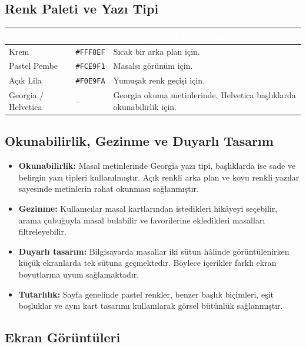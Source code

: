 \documentclass[12pt,a4paper]{article}
\begin{document}
\subsection{Renk Paleti ve Yazı Tipi}
\begin{center}
\begin{tabular}{@{}llp{6.4cm}@{}}
\toprule
\rowcolor{ana}\textcolor{white}{\textbf{Ad}} & \textcolor{white}{\textbf{Kod}} & \textcolor{white}{\textbf{Nerede / neden kullandınız?}} \\
\midrule
Krem & \texttt{\#FFF8EF} & Sıcak bir arka plan için. \\
Pastel Pembe & \texttt{\#FCE9F1} & Masalsı görünüm için. \\
Açık Lila & \texttt{\#F0E9FA} & Yumuşak renk geçişi için. \\
\relax Georgia / Helvetica & -- & Georgia okuma metinlerinde, Helvetica başlıklarda okunabilirlik için. \\
\bottomrule
\end{tabular}
\end{center}

\subsection{Okunabilirlik, Gezinme ve Duyarlı Tasarım}
\begin{itemize}
  \item \textbf{Okunabilirlik:} Masal metinlerinde Georgia yazı tipi, başlıklarda ise sade ve belirgin yazı tipleri kullanılmıştır. Açık renkli arka plan ve koyu renkli yazılar sayesinde metinlerin rahat okunması sağlanmıştır.
  \item \textbf{Gezinme:} Kullanıcılar masal kartlarından istedikleri hikâyeyi seçebilir, arama çubuğuyla masal bulabilir ve favorilerine ekledikleri masalları filtreleyebilir.
  \item \textbf{Duyarlı tasarım:} Bilgisayarda masallar iki sütun hâlinde görüntülenirken küçük ekranlarda tek sütuna geçmektedir. Böylece içerikler farklı ekran boyutlarına uyum sağlamaktadır.
  \item \textbf{Tutarlılık:} Sayfa genelinde pastel renkler, benzer başlık biçimleri, eşit boşluklar ve aynı kart tasarımı kullanılarak görsel bütünlük sağlanmıştır.
\end{itemize}

\subsection{Ekran Görüntüleri}
\end{document}
